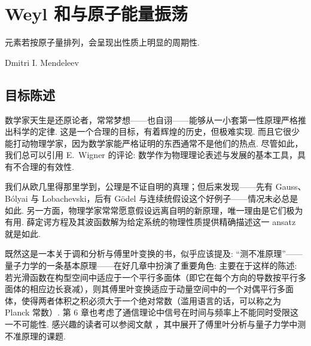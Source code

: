 
\chapter{Weyl 和与原子能量振荡}

\epigraph{元素若按原子量排列，会呈现出性质上明显的周期性.}{Dmitri I. Mendeleev}

\section{目标陈述}

数学家天生是还原论者，常常梦想——也自诩——能够从一小套第一性原理严格推出科学的定律. 这是一个合理的目标，有着辉煌的历史，但极难实现. 而且它很少能打动物理学家，因为数学家能严格证明的东西通常不是他们的热点. 尽管如此，我们总可以引用 E.~Wigner 的评论: 数学作为物理理论表述与发展的基本工具，具有不合理的有效性.

我们从欧几里得那里学到，公理是不证自明的真理；但后来发现——先有 Gauss、Bólyai 与 Lobachevski，后有 Gödel 与连续统假设这个好例子——情况未必总是如此. 另一方面，物理学家常常愿意假设远离自明的新原理，唯一理由是它们极为有用. 薛定谔方程及其波函数解为给定系统的物理性质提供精确描述这一 ansatz 就是如此.

既然这是一本关于调和分析与傅里叶变换的书，似乎应该提及: ``测不准原理''——量子力学的一条基本原理——在好几章中扮演了重要角色: 主要在于这样的陈述: 若光滑函数在构型空间中适应于一个平行多面体（即它在每个方向的导数按平行多面体的相应边长衰减），则其傅里叶变换适应于动量空间中的一个对偶平行多面体，使得两者体积之积必须大于一个绝对常数（滥用语言的话，可以称之为 Planck 常数）. 第 6 章也考虑了通信理论中信号在时间与频率上不能同时受限这一不可能性. 感兴趣的读者可以参阅文献 \cite{b199,b205,b214,b213}，其中展开了傅里叶分析与量子力学中测不准原理的课题.

